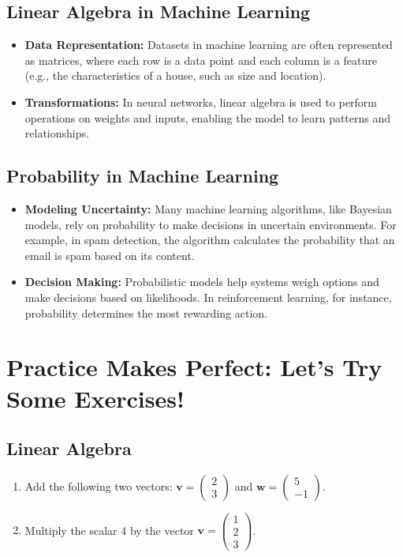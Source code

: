 \subsection{Linear Algebra in Machine Learning}
\begin{itemize}
    \item \textbf{Data Representation:} Datasets in machine learning are often represented as matrices, where each row is a data point and each column is a feature (e.g., the characteristics of a house, such as size and location).
    \item \textbf{Transformations:} In neural networks, linear algebra is used to perform operations on weights and inputs, enabling the model to learn patterns and relationships.
\end{itemize}

\subsection{Probability in Machine Learning}
\begin{itemize}
    \item \textbf{Modeling Uncertainty:} Many machine learning algorithms, like Bayesian models, rely on probability to make decisions in uncertain environments. For example, in spam detection, the algorithm calculates the probability that an email is spam based on its content.
    \item \textbf{Decision Making:} Probabilistic models help systems weigh options and make decisions based on likelihoods. In reinforcement learning, for instance, probability determines the most rewarding action.
\end{itemize}

\section{Practice Makes Perfect: Let’s Try Some Exercises!}
\subsection{Linear Algebra}
\begin{enumerate}
    \item Add the following two vectors: \(\mathbf{v} = \begin{pmatrix} 2 \\ 3 \end{pmatrix}\) and \(\mathbf{w} = \begin{pmatrix} 5 \\ -1 \end{pmatrix}\).
    \item Multiply the scalar 4 by the vector \(\mathbf{v} = \begin{pmatrix} 1 \\ 2 \\ 3 \end{pmatrix}\).
\end{enumerate}

